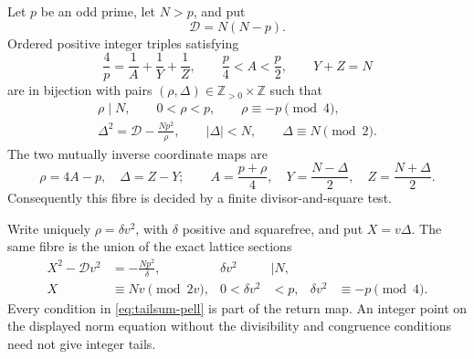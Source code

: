 \begin{theorem}\label{thm:tailsum}
Let $p$ be an odd prime, let $N>p$, and put
\[
 \mathcal D=N(N-p).
\]
Ordered positive integer triples satisfying
\[
 \frac4p=\frac1A+\frac1Y+\frac1Z,\qquad
 \frac p4<A<\frac p2,\qquad Y+Z=N
\]
are in bijection with pairs $(\rho,\Delta)\in\mathbb Z_{>0}\times\mathbb Z$
such that
\begin{equation}\label{eq:tailsum-gates}
 \begin{gathered}
  \rho\mid N,\qquad 0<\rho<p,\qquad \rho\equiv-p\pmod4,\\
  \Delta^2=\mathcal D-\frac{Np^2}{\rho},\qquad
  |\Delta|<N,\qquad \Delta\equiv N\pmod2.
 \end{gathered}
\end{equation}
The two mutually inverse coordinate maps are
\begin{equation}\label{eq:tailsum-inverse}
 \rho=4A-p,\quad \Delta=Z-Y;\qquad
 A=\frac{p+\rho}{4},\quad
 Y=\frac{N-\Delta}{2},\quad Z=\frac{N+\Delta}{2}.
\end{equation}
Consequently this fibre is decided by a finite divisor-and-square test.

Write uniquely $\rho=\delta v^2$, with $\delta$ positive and squarefree, and
put $X=v\Delta$.  The same fibre is the union of the exact lattice sections
\begin{equation}\label{eq:tailsum-pell}
\begin{aligned}
 X^2-\mathcal Dv^2&=-\frac{Np^2}{\delta},
 &\delta v^2&\mid N,\\
 X&\equiv Nv\pmod{2v},
 &0<\delta v^2&<p,
 &\delta v^2&\equiv-p\pmod4.
\end{aligned}
\end{equation}
Every condition in \eqref{eq:tailsum-pell} is part of the return map.  An
integer point on the displayed norm equation without the divisibility and
congruence conditions need not give integer tails.
\end{theorem}
